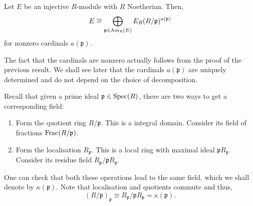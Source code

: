 \begin{cor}
	Let $E$ be an injective $R$-module with $R$ Noetherian. Then,
	\begin{equation} \label{eq:injective-decompose}
		E \cong \bigoplus_{\mathfrak{p} \in \operatorname{Ass}_{R}(E)} E_{R}(R/\mathfrak{p})^{a(\mathfrak{p})}
	\end{equation}
	for nonzero cardinals $a(\mathfrak{p})$.
\end{cor}
The fact that the cardinals are nonzero actually follows from the proof of the previous result. We shall see later that the cardinals $a(\mathfrak{p})$ are uniquely determined and do not depend on the choice of decomposition.

Recall that given a prime ideal $\mathfrak{p} \in \operatorname{Spec}(R)$, there are two ways to get a corresponding field:
\begin{enumerate}
	\item Form the quotient ring $R/\mathfrak{p}$. This is a integral domain. Consider its field of fractions $\operatorname{Frac}(R/\mathfrak{p})$.
	\item Form the localisation $R_{\mathfrak{p}}$. This is a local ring with maximal ideal $\mathfrak{p}R_{\mathfrak{p}}$. Consider its residue field $R_{\mathfrak{p}}/\mathfrak{p}R_{\mathfrak{p}}$.
\end{enumerate}
One can check that both these operations lead to the same field, which we shall denote by $\kappa(\mathfrak{p})$. Note that localisation and quotients commute and thus,
\begin{equation*} 
	(R/\mathfrak{p})_{\mathfrak{p}} \cong R_{\mathfrak{p}}/\mathfrak{p}R_{\mathfrak{p}} = \kappa(\mathfrak{p}).
\end{equation*}

